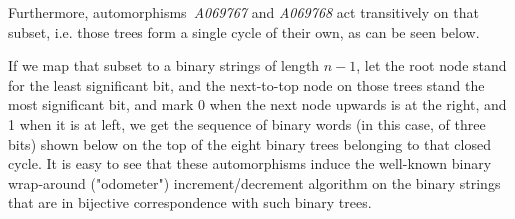 \documentclass[11pt]{article} %
\newcommand{\autname}[1]{{\it *#1}}
\def\automorphisms2#1#2{automorphisms~\autname{#1} and \autname{#2}}
\begin{document}
Furthermore, \automorphisms2{A069767}{A069768} act transitively on that subset,
i.e. those trees form a single cycle of their own, as can be seen below.

If we map that subset to a binary strings of length $n-1$, let the
root node stand for the least significant bit, and the next-to-top
node on those trees stand the most significant bit, and mark 0 when
the next node upwards is at the right, and 1 when it is at left, we
get the sequence of binary words (in this case, of three bits) shown
below on the top of the eight binary trees belonging to that closed
cycle.  It is easy to see that these automorphisms induce the
well-known binary wrap-around ("odometer") increment/decrement
algorithm on the binary strings that are in bijective correspondence
with such binary trees.

\end{document}
